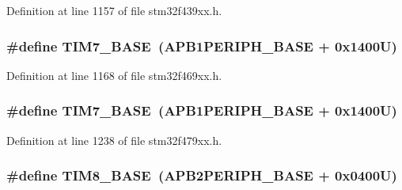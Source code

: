 Definition at line 1157 of file stm32f439xx.\+h.

\subsubsection[{\texorpdfstring{T\+I\+M7\+\_\+\+B\+A\+SE}{TIM7_BASE}}]{\setlength{\rightskip}{0pt plus 5cm}\#define T\+I\+M7\+\_\+\+B\+A\+SE~({\bf A\+P\+B1\+P\+E\+R\+I\+P\+H\+\_\+\+B\+A\+SE} + 0x1400\+U)}\hypertarget{group___peripheral__memory__map_ga0ebf54364c6a2be6eb19ded6b18b6387}{}\label{group___peripheral__memory__map_ga0ebf54364c6a2be6eb19ded6b18b6387}


Definition at line 1168 of file stm32f469xx.\+h.

\subsubsection[{\texorpdfstring{T\+I\+M7\+\_\+\+B\+A\+SE}{TIM7_BASE}}]{\setlength{\rightskip}{0pt plus 5cm}\#define T\+I\+M7\+\_\+\+B\+A\+SE~({\bf A\+P\+B1\+P\+E\+R\+I\+P\+H\+\_\+\+B\+A\+SE} + 0x1400\+U)}\hypertarget{group___peripheral__memory__map_ga0ebf54364c6a2be6eb19ded6b18b6387}{}\label{group___peripheral__memory__map_ga0ebf54364c6a2be6eb19ded6b18b6387}


Definition at line 1238 of file stm32f479xx.\+h.

\subsubsection[{\texorpdfstring{T\+I\+M8\+\_\+\+B\+A\+SE}{TIM8_BASE}}]{\setlength{\rightskip}{0pt plus 5cm}\#define T\+I\+M8\+\_\+\+B\+A\+SE~({\bf A\+P\+B2\+P\+E\+R\+I\+P\+H\+\_\+\+B\+A\+SE} + 0x0400\+U)}\hypertarget{group___peripheral__memory__map_ga5b72f698b7a048a6f9fcfe2efe5bc1db}{}\label{group___peripheral__memory__map_ga5b72f698b7a048a6f9fcfe2efe5bc1db}


